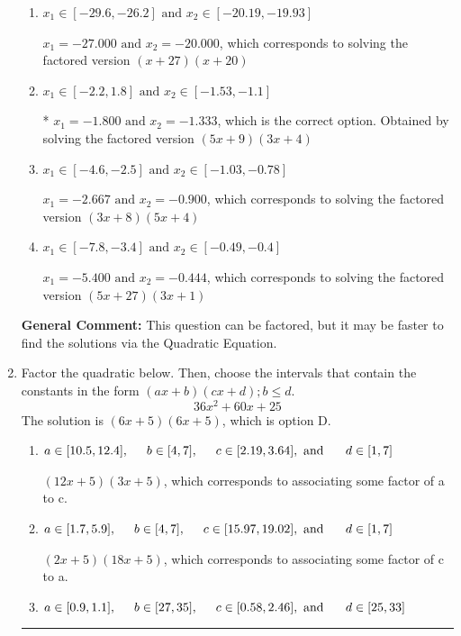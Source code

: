 \documentclass{extbook}[14pt]
\newcommand{\litem}[1]{\item #1

\rule{\textwidth}{0.4pt}}
\begin{document}
\begin{enumerate}
{\begin{enumerate}[label=\Alph*.]
$x_1 = -9.000 \text{ and } x_2 = -0.267$, which corresponds to solving the factored version $(x + 9)(15x + 4)$
\item \( x_1 \in [-29.6, -26.2] \text{ and } x_2 \in [-20.19, -19.93] \)

$x_1 = -27.000 \text{ and } x_2 = -20.000$, which corresponds to solving the factored version $(x + 27)(x + 20)$
\item \( x_1 \in [-2.2, 1.8] \text{ and } x_2 \in [-1.53, -1.1] \)

* $x_1 = -1.800 \text{ and } x_2 = -1.333$, which is the correct option. Obtained by solving the factored version $(5x + 9)(3x + 4)$
\item \( x_1 \in [-4.6, -2.5] \text{ and } x_2 \in [-1.03, -0.78] \)

$x_1 = -2.667 \text{ and } x_2 = -0.900$, which corresponds to solving the factored version $(3x + 8)(5x + 4)$
\item \( x_1 \in [-7.8, -3.4] \text{ and } x_2 \in [-0.49, -0.4] \)

$x_1 = -5.400 \text{ and } x_2 = -0.444$, which corresponds to solving the factored version $(5x + 27)(3x + 1)$
\end{enumerate}

\textbf{General Comment:} This question can be factored, but it may be faster to find the solutions via the Quadratic Equation.
}
\litem{
Factor the quadratic below. Then, choose the intervals that contain the constants in the form $(ax+b)(cx+d); b \leq d.$
\[ 36x^{2} +60 x + 25 \]The solution is \( (6x + 5)(6x + 5) \), which is option D.\begin{enumerate}[label=\Alph*.]
\item \( a \in [10.5, 12.4], \hspace*{5mm} b \in [4, 7], \hspace*{5mm} c \in [2.19, 3.64], \text{ and } \hspace*{5mm} d \in [1, 7] \)

 $(12x + 5)(3x + 5)$, which corresponds to associating some factor of a to c.
\item \( a \in [1.7, 5.9], \hspace*{5mm} b \in [4, 7], \hspace*{5mm} c \in [15.97, 19.02], \text{ and } \hspace*{5mm} d \in [1, 7] \)

 $(2x + 5)(18x + 5)$, which corresponds to associating some factor of c to a.
\item \( a \in [0.9, 1.1], \hspace*{5mm} b \in [27, 35], \hspace*{5mm} c \in [0.58, 2.46], \text{ and } \hspace*{5mm} d \in [25, 33] \)


\end{enumerate}}
\end{enumerate}
\end{document}
